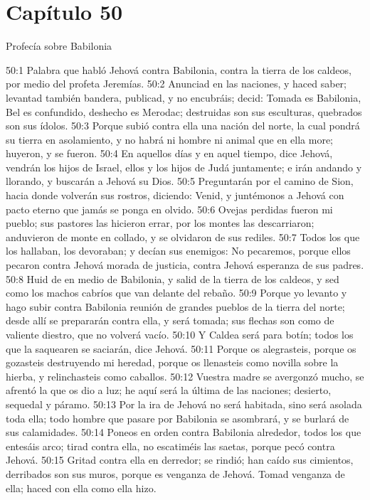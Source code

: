 \section*{Capítulo 50 }
Profecía sobre Babilonia 
 
50:1 Palabra que habló Jehová contra Babilonia,  contra la tierra de los caldeos, por medio del profeta Jeremías. 
50:2 Anunciad en las naciones, y haced saber; levantad también bandera, publicad, y no encubráis; decid: Tomada es Babilonia, Bel es confundido, deshecho es Merodac; destruidas son sus esculturas, quebrados son sus ídolos. 
50:3 Porque subió contra ella una nación del norte, la cual pondrá su tierra en asolamiento, y no habrá ni hombre ni animal que en ella more; huyeron, y se fueron. 
50:4 En aquellos días y en aquel tiempo, dice Jehová, vendrán los hijos de Israel, ellos y los hijos de Judá juntamente; e irán andando y llorando, y buscarán a Jehová su Dios. 
50:5 Preguntarán por el camino de Sion, hacia donde volverán sus rostros, diciendo: Venid, y juntémonos a Jehová con pacto eterno que jamás se ponga en olvido. 
50:6 Ovejas perdidas fueron mi pueblo; sus pastores las hicieron errar, por los montes las descarriaron; anduvieron de monte en collado, y se olvidaron de sus rediles. 
50:7 Todos los que los hallaban, los devoraban; y decían sus enemigos: No pecaremos, porque ellos pecaron contra Jehová morada de justicia, contra Jehová esperanza de sus padres. 
50:8 Huid de en medio de Babilonia, y salid de la tierra de los caldeos, y sed como los machos cabríos que van delante del rebaño. 
50:9 Porque yo levanto y hago subir contra Babilonia reunión de grandes pueblos de la tierra del norte; desde allí se prepararán contra ella, y será tomada; sus flechas son como de valiente diestro, que no volverá vacío. 
50:10 Y Caldea será para botín; todos los que la saquearen se saciarán, dice Jehová. 
50:11 Porque os alegrasteis, porque os gozasteis destruyendo mi heredad, porque os llenasteis como novilla sobre la hierba, y relinchasteis como caballos. 
50:12 Vuestra madre se avergonzó mucho, se afrentó la que os dio a luz; he aquí será la última de las naciones; desierto, sequedal y páramo. 
50:13 Por la ira de Jehová no será habitada, sino será asolada toda ella; todo hombre que pasare por Babilonia se asombrará, y se burlará de sus calamidades. 
50:14 Poneos en orden contra Babilonia alrededor, todos los que entesáis arco; tirad contra ella, no escatiméis las saetas, porque pecó contra Jehová. 
50:15 Gritad contra ella en derredor; se rindió; han caído sus cimientos, derribados son sus muros, porque es venganza de Jehová. Tomad venganza de ella; haced con ella como ella hizo. 
